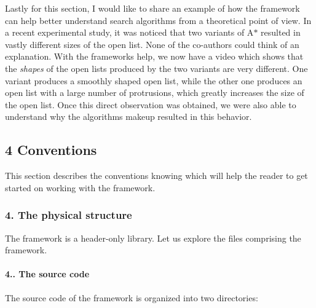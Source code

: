 Lastly for this section, I would like to share an example of how the framework can help better understand search algorithms from a theoretical point of view. In a recent experimental study, it was noticed that two variants of A$\ast$ resulted in vastly different sizes of the open list. None of the co-\/authors could think of an explanation. With the framework\textquotesingle{}s help, we now have a video which shows that the {\itshape shapes} of the open lists produced by the two variants are very different. One variant produces a smoothly shaped open list, while the other one produces an open list with a large number of protrusions, which greatly increases the size of the open list. Once this direct observation was obtained, we were also able to understand why the algorithms\textquotesingle{} makeup resulted in this behavior.\hypertarget{index_s-concepts}{}\subsection{4 Conventions}\label{index_s-concepts}
This section describes the conventions knowing which will help the reader to get started on working with the framework.\hypertarget{index_s-physical}{}\subsubsection{4. The physical structure}\label{index_s-physical}
The framework is a header-\/only library. Let us explore the files comprising the framework.\hypertarget{index_s-source}{}\paragraph{4.. The source code}\label{index_s-source}
The source code of the framework is organized into two directories\+:
